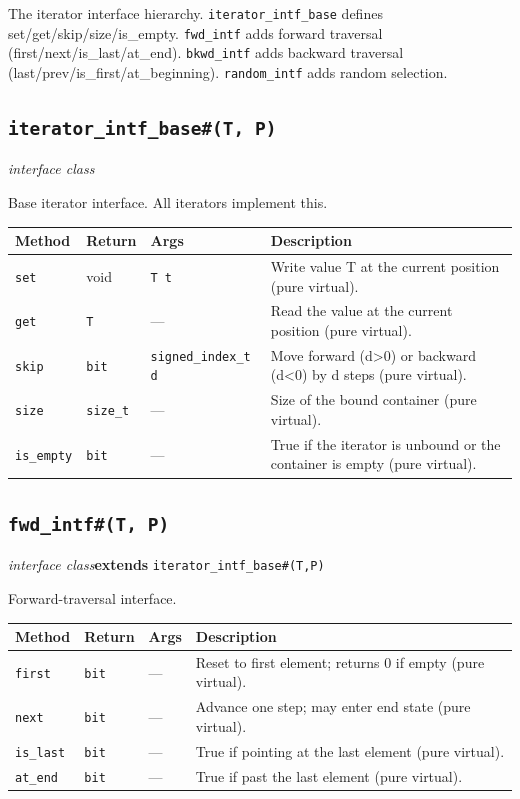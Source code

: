 \documentclass[11pt,letterpaper]{report}
\begin{document}
The iterator interface hierarchy. \texttt{iterator\_intf\_base} defines set/get/skip/size/is\_empty. \texttt{fwd\_intf} adds forward traversal (first/next/is\_last/at\_end). \texttt{bkwd\_intf} adds backward traversal (last/prev/is\_first/at\_beginning). \texttt{random\_intf} adds random selection.

\subsection*{\texttt{iterator\_intf\_base\#(T, P)}}
\noindent\small\textit{interface class}\par

Base iterator interface. All iterators implement this.

\begin{xltabular}{\linewidth}{>{\small}p{1.35in} >{\small}p{1.25in} >{\small}p{0.95in} >{\small}X}
\toprule
\textbf{Method} & \textbf{Return} & \textbf{Args} & \textbf{Description} \\
\midrule
\endhead
\bottomrule
\endfoot
\texttt{set} & void & \texttt{T t} & Write value T at the current position (pure virtual). \\
\texttt{get} & \texttt{T} & --- & Read the value at the current position (pure virtual). \\
\texttt{skip} & \texttt{bit} & \texttt{signed\_index\_t d} & Move forward (d\textgreater{}0) or backward (d\textless{}0) by d steps (pure virtual). \\
\texttt{size} & \texttt{size\_t} & --- & Size of the bound container (pure virtual). \\
\texttt{is\_empty} & \texttt{bit} & --- & True if the iterator is unbound or the container is empty (pure virtual). \\
\end{xltabular}

\subsection*{\texttt{fwd\_intf\#(T, P)}}
\noindent\small\textit{interface class}\quad \textbf{extends} \texttt{iterator\_intf\_base\#(T,P)}\par

Forward-traversal interface.

\begin{xltabular}{\linewidth}{>{\small}p{1.35in} >{\small}p{1.25in} >{\small}p{0.95in} >{\small}X}
\toprule
\textbf{Method} & \textbf{Return} & \textbf{Args} & \textbf{Description} \\
\midrule
\endhead
\bottomrule
\endfoot
\texttt{first} & \texttt{bit} & --- & Reset to first element; returns 0 if empty (pure virtual). \\
\texttt{next} & \texttt{bit} & --- & Advance one step; may enter end state (pure virtual). \\
\texttt{is\_last} & \texttt{bit} & --- & True if pointing at the last element (pure virtual). \\
\texttt{at\_end} & \texttt{bit} & --- & True if past the last element (pure virtual). \\
\end{xltabular}
\end{document}
